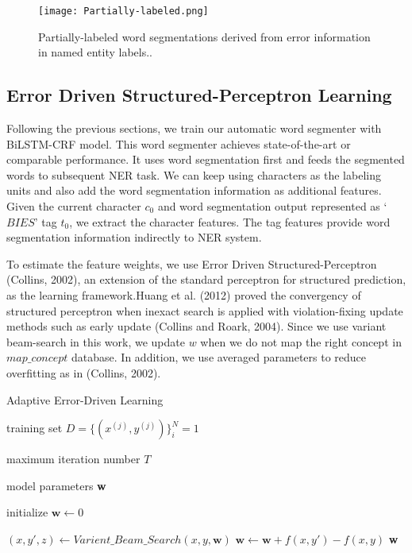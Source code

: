 \documentclass[conference]{IEEEtran}
\begin{document}
\begin{figure}[htbp]
\centering
\centerline{\texttt{[image: Partially-labeled.png]}}
\caption{Partially-labeled word segmentations derived from error information in named entity labels..}
\label{fig:Partially-labeled}
\end{figure}

\subsection{Error Driven Structured-Perceptron Learning}
Following the previous sections, we train our automatic word segmenter with BiLSTM-CRF model. This word segmenter achieves state-of-the-art or comparable performance. It uses word segmentation first and feeds the segmented words to subsequent NER task. We can keep using characters as the labeling units and also add the word segmentation information as additional features. Given the current character $c_0$ and word segmentation output represented as ‘$BIES$’  tag $t_0$, we extract the character features. The tag features provide word segmentation information indirectly to NER system.

To estimate the feature weights, we use Error Driven Structured-Perceptron (Collins, 2002), an extension of the standard perceptron for structured prediction, as the learning framework.Huang et al. (2012) proved the convergency of structured perceptron when inexact search is applied with violation-fixing update methods such as early update (Collins and Roark, 2004). Since we use variant beam-search in this work, we update $w$ when we do not map the right concept in $map\_concept$  database. In addition, we use averaged parameters to reduce overfitting as in (Collins, 2002).

\begin{algorithm}  
\caption{Adaptive Error-Driven Learning}  
\label{alg:A}  
\begin{algorithmic}[1] 
\Require
\qquad 

training set $D = \{(x^{(j)}, y^{(j)})\}^N_i=1$

maximum iteration number $T$

\Ensure
\qquad 

model parameters \textbf{w}

\State initialize $\textbf{w} \leftarrow 0$

		\State $(x, y', z) \leftarrow  Varient\_Beam\_Search(x,y,\textbf{w})$
			\State $\textbf{w} \leftarrow \textbf{w} + f(x,y')-f(x,y)$
		\EndIf
	\EndFor
\EndFor
\State \Return \textbf{w}
\end{algorithmic}  
\end{algorithm} 
\end{document}
